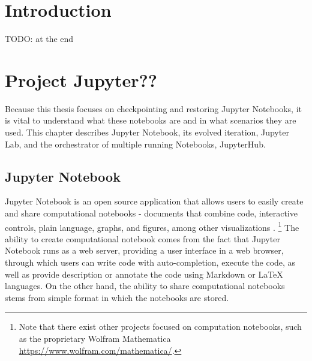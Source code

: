\documentclass[
  digital,     %
  oneside,     %
  nosansbold,  %
  nocolorbold, %
  lof,         %
  lot,         %
]{fithesis4}
\begin{document}
\chapter*{Introduction}

TODO: at the end

\chapter{Project Jupyter??}
Because this thesis focuses on checkpointing and restoring Jupyter Notebooks, it is vital to understand what these notebooks are and in what scenarios they are used. This chapter describes Jupyter Notebook, its evolved iteration, Jupyter Lab, and the orchestrator of multiple running Notebooks, JupyterHub.

\section{Jupyter Notebook}
Jupyter Notebook is an open source application that allows users to easily create and share computational notebooks - documents that combine code, interactive controls, plain language, graphs, and figures, among other visualizations \cite{jupyter_notebook}.
\footnote{Note that there exist other projects focused on computation notebooks, such as the proprietary Wolfram Mathematica \url{https://www.wolfram.com/mathematica/}.}
The ability to create computational notebook comes from the fact that Jupyter Notebook runs as a web server, providing a user interface in a web browser, through which users can write code with auto-completion, execute the code, as well as provide description or annotate the code using Markdown or LaTeX languages.
On the other hand, the ability to share computational notebooks stems from simple format in which the notebooks are stored. 
\end{document}
